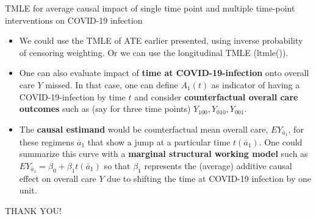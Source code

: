 \documentclass[t]{beamer}
\begin{document}
\begin{frame}{TMLE for average causal impact of single time point and multiple time-point interventions on COVID-19 infection}
\begin{itemize}
\item We could use the TMLE of ATE earlier presented, using inverse probability of censoring weighting. Or we can use the longitudinal TMLE (ltmle()).
\item One can also evaluate impact of {\bf time at  COVID-19-infection}  onto overall care $Y$ missed. In that case, one can define $A_1(t)$ as indicator of having a COVID-19-infection by time $t$ and consider {\bf counterfactual overall care outcomes}  such as (say for three time points) $Y_{100}, Y_{010}, Y_{001}$.
\item The {\bf causal estimand} would be counterfactual mean overall care, $EY_{\bar{a}_1}$, for these regimens $\bar{a}_1$ that show a jump at a particular time $t(\bar{a}_1)$. One could summarize this curve with a {\bf marginal structural working model} such as $EY_{\bar{a}_1}=\beta_0+\beta_1 t(\bar{a}_1)$ so that $\beta_1$ represents the (average) additive causal effect on overall care $Y$ due to  shifting the time at COVID-19  infection by one unit.
\end{itemize}
\end{frame}
\begin{frame}\begin{center}
THANK YOU!
\end{center}
\end{frame}


\end{document}
